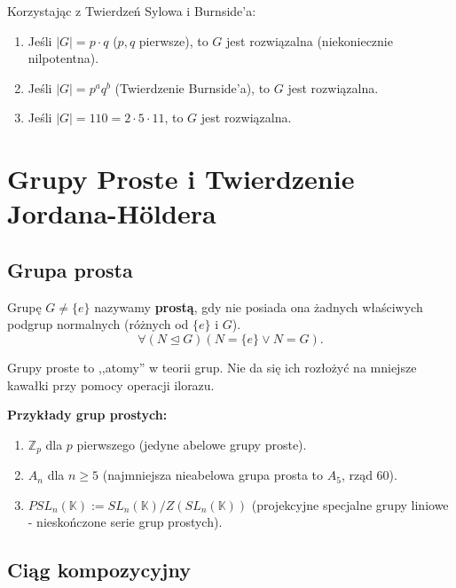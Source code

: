 \begin{eg}
	Korzystając z Twierdzeń Sylowa i Burnside'a:
	\begin{enumerate}[label=\arabic*)]
		\item Jeśli $|G| = p \cdot q$ ($p,q$ pierwsze), to $G$ jest rozwiązalna (niekoniecznie nilpotentna).
		\item Jeśli $|G| = p^a q^b$ (Twierdzenie Burnside'a), to $G$ jest rozwiązalna.
		\item Jeśli $|G| = 110 = 2 \cdot 5 \cdot 11$, to $G$ jest rozwiązalna.
	\end{enumerate}
\end{eg}


\section{Grupy Proste i Twierdzenie Jordana-Höldera}

\subsection{Grupa prosta}

\begin{definition}
	Grupę $G \neq \{e\}$ nazywamy \textbf{prostą}, gdy nie posiada ona żadnych właściwych podgrup normalnych (różnych od $\{e\}$ i $G$).
	\[ \forall \left( N \unlhd G \right) \left( N = \{e\} \lor N = G \right). \]
\end{definition} 

\begin{intuition}
	Grupy proste to ,,atomy'' w teorii grup. Nie da się ich rozłożyć na mniejsze kawałki przy pomocy operacji ilorazu.
\end{intuition}

\textbf{Przykłady grup prostych:}
\begin{enumerate}[label=\arabic*)]
	\item $\mathbb{Z}_p$ dla $p$ pierwszego (jedyne abelowe grupy proste).
	\item $A_n$ dla $n \ge 5$ (najmniejsza nieabelowa grupa prosta to $A_5$, rząd 60).
	\item $PSL_{n}(\mathbb{K}) := SL_{n}(\mathbb{K}) / Z(SL_{n}(\mathbb{K}))$ (projekcyjne specjalne grupy liniowe - nieskończone serie grup prostych).
\end{enumerate}

\subsection{Ciąg kompozycyjny}

